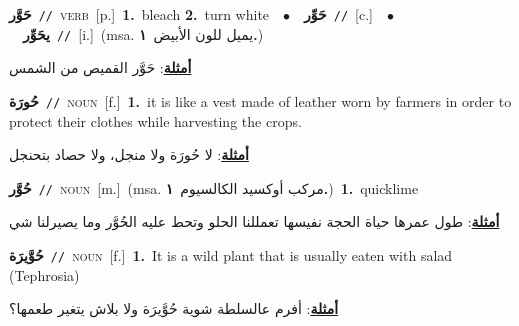 \documentclass[10pt,a4paper,twoside]{article} %
\begin{document}
\begin{multicols}{2}
{\setlength\topsep{0pt}\textbf{\foreignlanguage{arabic}{حَوَّر}}\ {\color{gray}\texttt{//}\color{black}}\ \textsc{verb}\ [p.]\ \textbf{1.}~bleach  \textbf{2.}~turn white\ \ $\bullet$\ \ \setlength\topsep{0pt}\textbf{\foreignlanguage{arabic}{حَوِّر}}\ {\color{gray}\texttt{//}\color{black}}\ [c.]\ \ $\bullet$\ \ \setlength\topsep{0pt}\textbf{\foreignlanguage{arabic}{يحَوِّر}}\ {\color{gray}\texttt{//}\color{black}}\ [i.]\ \color{gray}(msa. \foreignlanguage{arabic}{يميل للون الأبيض}~\foreignlanguage{arabic}{\textbf{١.}})\color{black}\  \begin{flushright}\color{gray}\foreignlanguage{arabic}{\textbf{\underline{\foreignlanguage{arabic}{أمثلة}}}: حَوَّر القميص من الشمس}\end{flushright}\color{black}} \vspace{2mm}

{\setlength\topsep{0pt}\textbf{\foreignlanguage{arabic}{حُورَة}}\ {\color{gray}\texttt{//}\color{black}}\ \textsc{noun}\ [f.]\ \textbf{1.}~it is like a vest made of leather worn by farmers in order to protect their clothes while harvesting the crops.\  \begin{flushright}\color{gray}\foreignlanguage{arabic}{\textbf{\underline{\foreignlanguage{arabic}{أمثلة}}}: لا حُورَة ولا منجل، ولا حصاد بتحنجل}\end{flushright}\color{black}} \vspace{2mm}

{\setlength\topsep{0pt}\textbf{\foreignlanguage{arabic}{حُوَّر}}\ {\color{gray}\texttt{//}\color{black}}\ \textsc{noun}\ [m.]\ \color{gray}(msa. \foreignlanguage{arabic}{مركب أوكسيد الكالسيوم}~\foreignlanguage{arabic}{\textbf{١.}})\color{black}\ \textbf{1.}~quicklime\  \begin{flushright}\color{gray}\foreignlanguage{arabic}{\textbf{\underline{\foreignlanguage{arabic}{أمثلة}}}: طول عمرها حياة الحجة نفيسها تعمللنا الحلو وتحط عليه الحُوَّر وما يصيرلنا شي}\end{flushright}\color{black}} \vspace{2mm}

{\setlength\topsep{0pt}\textbf{\foreignlanguage{arabic}{حُوَّيرَة}}\ {\color{gray}\texttt{//}\color{black}}\ \textsc{noun}\ [f.]\ \textbf{1.}~It is a wild plant that is usually eaten with salad (Tephrosia)\  \begin{flushright}\color{gray}\foreignlanguage{arabic}{\textbf{\underline{\foreignlanguage{arabic}{أمثلة}}}: أفرم عالسلطة شوية حُوَّيرَة ولا بلاش يتغير طعمها؟}\end{flushright}\color{black}} \vspace{2mm}


\end{multicols}
\end{document}
